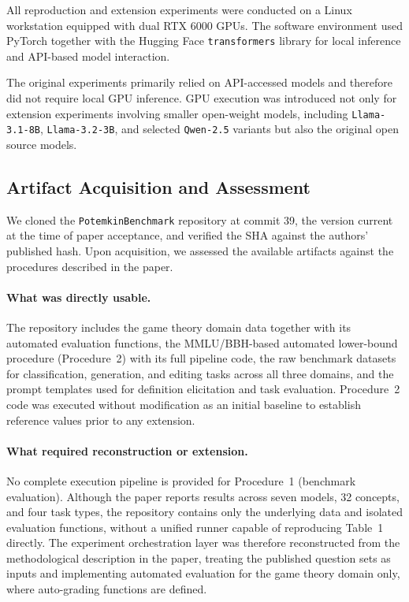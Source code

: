 \documentclass[sigconf,authordraft]{acmart}
\begin{document}
All reproduction and extension experiments were conducted on a Linux workstation equipped with dual RTX 6000 GPUs. The software environment used PyTorch together with the Hugging Face \texttt{transformers} library for local inference and API-based model interaction.

The original experiments primarily relied on API-accessed models and therefore did not require local GPU inference. GPU execution was introduced not only for extension experiments involving smaller open-weight models, including \texttt{Llama-3.1-8B}, \texttt{Llama-3.2-3B}, and selected \texttt{Qwen-2.5} variants but also the original open source models.


\subsection{Artifact Acquisition and Assessment}

We cloned the \texttt{PotemkinBenchmark} repository at commit 39, the version current at the time of paper acceptance, and verified the SHA against the authors' published hash. Upon acquisition, we assessed the available artifacts against the procedures described in the paper.

\paragraph{What was directly usable.}
The repository includes the game theory domain data together with its automated evaluation functions, the MMLU/BBH-based automated lower-bound procedure (Procedure~2) with its full pipeline code, the raw benchmark datasets for classification, generation, and editing tasks across all three domains, and the prompt templates used for definition elicitation and task evaluation. Procedure~2 code was executed without modification as an initial baseline to establish reference values prior to any extension.

\paragraph{What required reconstruction or extension.}
No complete execution pipeline is provided for Procedure~1 (benchmark evaluation). Although the paper reports results across seven models, 32 concepts, and four task types, the repository contains only the underlying data and isolated evaluation functions, without a unified runner capable of reproducing Table~1 directly. The experiment orchestration layer was therefore reconstructed from the methodological description in the paper, treating the published question sets as inputs and implementing automated evaluation for the game theory domain only, where auto-grading functions are defined.
\end{document}
